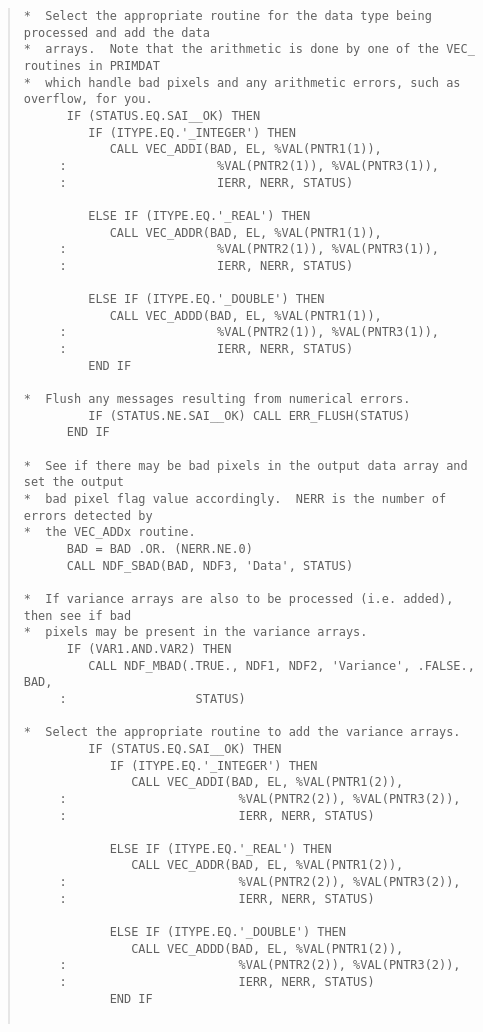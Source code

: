 \begin{quote}
\begin{small}
\begin{verbatim}
*  Select the appropriate routine for the data type being processed and add the data
*  arrays.  Note that the arithmetic is done by one of the VEC_ routines in PRIMDAT
*  which handle bad pixels and any arithmetic errors, such as overflow, for you.
      IF (STATUS.EQ.SAI__OK) THEN
         IF (ITYPE.EQ.'_INTEGER') THEN
            CALL VEC_ADDI(BAD, EL, %VAL(PNTR1(1)),
     :                     %VAL(PNTR2(1)), %VAL(PNTR3(1)),
     :                     IERR, NERR, STATUS)

         ELSE IF (ITYPE.EQ.'_REAL') THEN
            CALL VEC_ADDR(BAD, EL, %VAL(PNTR1(1)),
     :                     %VAL(PNTR2(1)), %VAL(PNTR3(1)),
     :                     IERR, NERR, STATUS)

         ELSE IF (ITYPE.EQ.'_DOUBLE') THEN
            CALL VEC_ADDD(BAD, EL, %VAL(PNTR1(1)),
     :                     %VAL(PNTR2(1)), %VAL(PNTR3(1)),
     :                     IERR, NERR, STATUS)
         END IF

*  Flush any messages resulting from numerical errors.
         IF (STATUS.NE.SAI__OK) CALL ERR_FLUSH(STATUS)
      END IF

*  See if there may be bad pixels in the output data array and set the output
*  bad pixel flag value accordingly.  NERR is the number of errors detected by
*  the VEC_ADDx routine.
      BAD = BAD .OR. (NERR.NE.0)
      CALL NDF_SBAD(BAD, NDF3, 'Data', STATUS)

*  If variance arrays are also to be processed (i.e. added), then see if bad
*  pixels may be present in the variance arrays.
      IF (VAR1.AND.VAR2) THEN
         CALL NDF_MBAD(.TRUE., NDF1, NDF2, 'Variance', .FALSE., BAD,
     :                  STATUS)

*  Select the appropriate routine to add the variance arrays.
         IF (STATUS.EQ.SAI__OK) THEN
            IF (ITYPE.EQ.'_INTEGER') THEN
               CALL VEC_ADDI(BAD, EL, %VAL(PNTR1(2)),
     :                        %VAL(PNTR2(2)), %VAL(PNTR3(2)),
     :                        IERR, NERR, STATUS)

            ELSE IF (ITYPE.EQ.'_REAL') THEN
               CALL VEC_ADDR(BAD, EL, %VAL(PNTR1(2)),
     :                        %VAL(PNTR2(2)), %VAL(PNTR3(2)),
     :                        IERR, NERR, STATUS)

            ELSE IF (ITYPE.EQ.'_DOUBLE') THEN
               CALL VEC_ADDD(BAD, EL, %VAL(PNTR1(2)),
     :                        %VAL(PNTR2(2)), %VAL(PNTR3(2)),
     :                        IERR, NERR, STATUS)
            END IF


\end{verbatim}
\end{small}
\end{quote}
